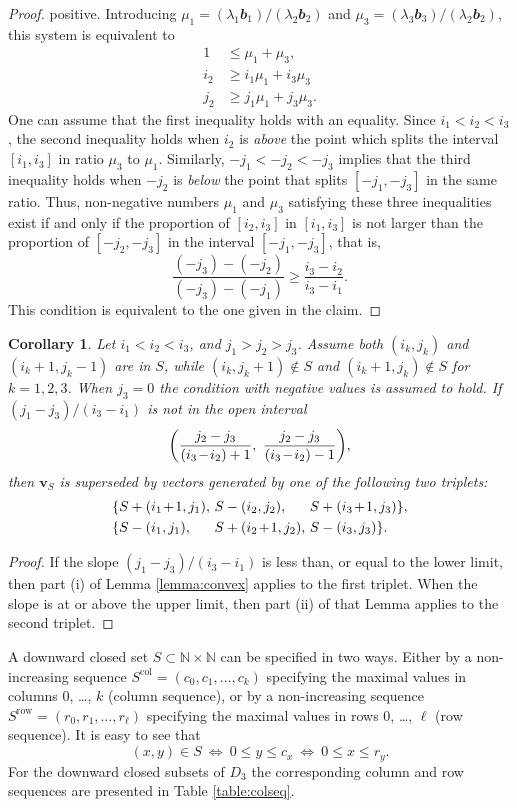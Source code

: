 \documentclass[reqno]{amsart}
\newtheorem{corollary}[theorem]{Corollary}
\theoremstyle{definition}
\newcommand\tsp{\mkern 1.5mu}
\renewcommand\ge{\geqslant}\renewcommand\le{\leqslant}
\newcommand\N{\mathbb N}  %
\def\b{\mathbfit b}
\def\m#1{\tsp{#1}\tsp}
\begin{document}
\begin{proof}
positive. Introducing $\mu_1=(\lambda_1\b_1)/(\lambda_2\b_2)$ and
$\mu_3=(\lambda_3\b_3)/(\lambda_2\b_2)$, this system is equivalent to
\begin{align*}
    1 & \le \mu_1+\mu_3, \\
  i_2 & \ge i_1\mu_1 + i_3\mu_3 \\
  j_2 & \ge j_1\mu_1 + j_3\mu_3.
\end{align*}
One can assume that the first inequality holds with an equality.
Since $i_1<i_2<i_3$, the second inequality holds when $i_2$ is \emph{above} the
point which splits the interval $[i_1,i_3]$ in ratio $\mu_3$ to $\mu_1$.
Similarly, $-j_1<-j_2<-j_3$ implies that the third inequality holds when
$-j_2$ is \emph{below} the point that splits $[-j_1,-j_3]$ in the same
ratio. Thus, non-negative numbers $\mu_1$ and $\mu_3$ satisfying these three
inequalities exist if and only if the proportion of $[i_2,i_3]$ in
$[i_1,i_3]$ is not larger than the proportion of $[-j_2,-j_3]$ in the
interval $[-j_1,-j_3]$, that is,
$$
    \frac{(-j_3)-(-j_2)}{(-j_3)-(-j_1)} \ge \frac{i_3-i_2}{i_3-i_1}.
$$
This condition is equivalent to the one given in the claim.
\end{proof}

\begin{corollary}\label{corr:slope}
Let $i_1<i_2<i_3$, and $j_1>j_2>j_3$. Assume both $(i_k,j_k)$ and
$(i_k+1,j_k-1)$ are in $S$, while $(i_k,j_k+1)\notin S$ and
$(i_k+1,j_k)\notin S$ for $k=1,2,3$. When $j_3=0$ the condition with negative
values is assumed to hold. If $(j_1-j_3)/(i_3-i_1)$ is not in the open
interval
$$
    \bigg( \frac{j_2-j_3}{(i_3\m-i_2)+1} ,~
         \frac{j_2-j_3}{(i_3\m-i_2)-1} \bigg),
$$
then $\mathbf v_S$ is superseded by vectors generated by one of
the following two triplets:
$$\begin{array}{l@{~}l@{~}l}
\{S+(i_1\m+1,j_1), &S-(i_2,j_2), &S+(i_3\m+1,j_3)\}, \\[3pt]
\{S-(i_1,j_1), &S+(i_2\m+1,j_2), &S-(i_3,j_3)\}.
\end{array}$$
\end{corollary}

\begin{proof}
If the slope $(j_1-j_3)/(i_3-i_1)$ is less than, or equal to the lower limit,
then part (i) of Lemma \ref{lemma:convex} applies to the first triplet. When
the slope is at or above the upper limit, then part (ii) of that Lemma applies
to the second triplet.
\end{proof}


A downward closed set $S\subset\N\times\N$ can be specified in two ways.
Either by a non-increasing sequence $S^{\mathrm{col}} =(c_0,c_1,\dots,c_k)$
specifying the maximal values in columns $0$, \dots, $k$ (column sequence),
or by a non-increasing sequence $S^{\mathrm{row}}=(r_0,r_1,\dots,r_\ell)$
specifying the maximal values in rows $0$, \dots, $\ell$ (row sequence). It
is easy to see that
$$
    (x,y)\in S ~\Leftrightarrow~ 0\le y\le c_x ~\Leftrightarrow~ 0\le x\le r_y.
$$
For the downward closed subsets of $D_3$ the corresponding column and row
sequences are presented in Table \ref{table:colseq}.
\end{document}
